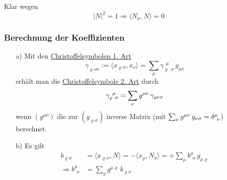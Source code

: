 \begin{beweis}
 Klar wegen 
 \[
  |N|^2 = 1 \Rightarrow \langle N_\sigma, N \rangle = 0
 \]
\end{beweis}

\subsubsection*{Berechnung der Koeffizienten}
\begin{enumerate}
 \item[a)] Mit den \uline{Christoffelsymbolen 1. Art}
 \[
  \gamma_{\varrho \nu \sigma} := \langle x_{\varrho \sigma}, x_\nu \rangle = \sum_\mu \gamma_{\varrho \;\, \sigma}^{\;\,\mu} \, g_{\mu \nu}
 \]
 erhält man die \uline{Christoffelsymbole 2. Art} durch
 \[
  \gamma_{\varrho \;\, \sigma}^{\;\, \mu} = \sum_\nu g^{\mu\nu} \, \gamma_{\varrho \nu \sigma}
 \]
 wenn \((g^{\mu\nu})\) die zur \((g_{\varrho \sigma})\) inverse Matrix (mit \(\sum_\nu g^{\mu\nu} \, g_{\nu \sigma} = \delta^\mu_{\;\, \nu}\)) berechnet.
 \item[b)] Es gilt
 \begin{align*}
  b_{\varrho\sigma} &= \langle x_{\varrho\sigma}, N \rangle = -\langle x_{\varrho}, N_\sigma \rangle = + \sum_\mu b^\mu_{\;\,\sigma} \, g_{\mu \varrho} \\
  \Rightarrow b^\mu_{\;\,\sigma} &= \sum_{\varrho} g^{\mu\varrho} \, b_{\varrho\sigma}
 \end{align*}
\end{enumerate}

